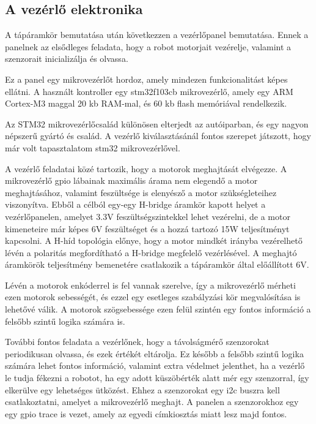 
\subsection{A vezérlő elektronika}
A tápáramkör bemutatása után következzen a vezérlőpanel bemutatása. Ennek a
panelnek az elsődleges feladata, hogy a robot motorjait vezérelje, valamint
a szenzorait inicializálja és olvassa.

Ez a panel egy mikrovezérlőt hordoz, amely mindezen funkcionalitást képes
ellátni. A használt kontroller egy stm32f103cb mikrovezérlő, amely egy
ARM Cortex-M3 maggal 20 kb RAM-mal, és 60 kb flash memóriával rendelkezik.

Az STM32 mikrovezérlőcsalád különösen elterjedt az autóiparban, és egy
nagyon népszerű gyártó és család. A vezérlő kiválasztásánál fontos szerepet
játszott, hogy már volt tapasztalatom stm32 mikrovezérlővel.

\medskip

A vezérlő feladatai közé tartozik, hogy a motorok meghajtását elvégezze. A
mikrovezérlő gpio lábainak maximális árama nem elegendő a motor meghajtásához,
valamint feszültsége is elenyésző a motor szükségleteihez viszonyítva. Ebből a
célból egy-egy H-bridge áramkör kapott helyet a vezérlőpanelen, amelyet 3.3V
feszültségszintekkel lehet vezérelni, de a motor kimeneteire már képes 6V
feszültséget és a hozzá tartozó 15W teljesítményt kapcsolni. A H-híd topológia
előnye, hogy a motor mindkét irányba vezérelhető lévén a polaritás megfordítható
a H-bridge megfelelő vezérlésével. A meghajtó áramkörök teljesítmény bemenetére
csatlakozik a tápáramkör által előállított 6V.

Lévén a motorok enkóderrel is fel vannak szerelve, így a mikrovezérlő mérheti
ezen motorok sebességét, és ezzel egy esetleges szabályzási kör megvalósítása is
lehetővé válik. A motorok szögsebessége ezen felül szintén egy fontos információ
a felsőbb szintű logika számára is.

További fontos feladata a vezérlőnek, hogy a távolságmérő szenzorokat
periodikusan olvassa, és ezek értékét eltárolja. Ez később a felsőbb szintű
logika számára lehet fontos információ, valamint extra védelmet jelenthet, ha a
vezérlő le tudja fékezni a robotot, ha egy adott küszöbérték alatt mér egy
szenzorral, így elkerülve egy lehetséges ütközést. Ehhez a szenzorokat egy
i2c buszra kell csatlakoztatni, amelyet a mikrovezérlő meghajt. A panelen
a szenzorokhoz egy egy gpio trace is vezet, amely az egyedi címkiosztás miatt
lesz majd fontos.

